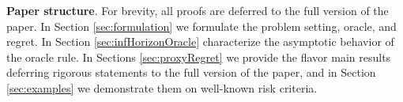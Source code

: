 \documentclass[final,12pt]{colt2018}
\newcommand{\UUCB}{\RHat-UCB}
\newcommand{\RHat}[1][]{{U}^{#1}}
\begin{document}
	
	
%	
	
	\textbf{Paper structure}.
	For brevity, all proofs are deferred to the full version of the paper. In Section \ref{sec:formulation} we formulate the problem setting, oracle, and regret. In Section \ref{sec:infHorizonOracle} characterize the asymptotic behavior of the oracle rule. In Sections \ref{sec:proxyRegret} we provide the flavor main results deferring rigorous statements to the full version of the paper, and in Section \ref{sec:examples} we demonstrate them on well-known risk criteria.
	
	
\end{document}
